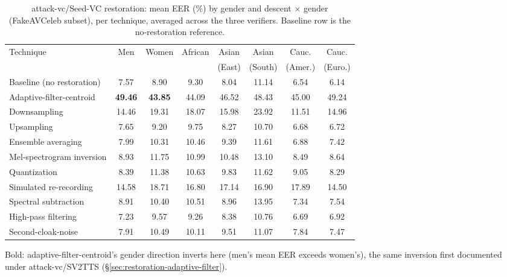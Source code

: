 \documentclass[11pt]{article}
\begin{document}
\begin{table}[H]
\centering
\caption{attack-vc/Seed-VC restoration: mean EER (\%) by gender and
descent $\times$ gender (FakeAVCeleb subset), per technique, averaged
across the three verifiers. Baseline row is the no-restoration
reference.}
\label{tab:restoration-attackvc-seedvc-demo}
\begin{tabular}{lccccccc}
\toprule
Technique & Men & Women & African & Asian & Asian & Cauc. & Cauc. \\
 & & & & (East) & (South) & (Amer.) & (Euro.) \\
\midrule
Baseline (no restoration) & 7.57 & 8.90 & 9.30 & 8.04 & 11.14 & 6.54 & 6.14 \\
Adaptive-filter-centroid & \textbf{49.46} & \textbf{43.85} & 44.09 & 46.52 & 48.43 & 45.00 & 49.24 \\
Downsampling & 14.46 & 19.31 & 18.07 & 15.98 & 23.92 & 11.51 & 14.96 \\
Upsampling & 7.65 & 9.20 & 9.75 & 8.27 & 10.70 & 6.68 & 6.72 \\
Ensemble averaging & 7.99 & 10.31 & 10.46 & 9.39 & 11.61 & 6.88 & 7.42 \\
Mel-spectrogram inversion & 8.93 & 11.75 & 10.99 & 10.48 & 13.10 & 8.49 & 8.64 \\
Quantization & 8.39 & 11.38 & 10.63 & 9.83 & 11.62 & 9.05 & 8.29 \\
Simulated re-recording & 14.58 & 18.71 & 16.80 & 17.14 & 16.90 & 17.89 & 14.50 \\
Spectral subtraction & 8.91 & 10.40 & 10.51 & 8.96 & 13.95 & 7.34 & 7.54 \\
High-pass filtering & 7.23 & 9.57 & 9.26 & 8.38 & 10.76 & 6.69 & 6.92 \\
Second-cloak-noise & 7.91 & 10.49 & 10.11 & 9.51 & 11.07 & 7.84 & 7.47 \\
\bottomrule
\end{tabular}

{\small Bold: adaptive-filter-centroid's gender direction inverts here
(men's mean EER exceeds women's), the same inversion first documented
under attack-vc/SV2TTS (\S\ref{sec:restoration-adaptive-filter}).}
\end{table}
\end{document}
